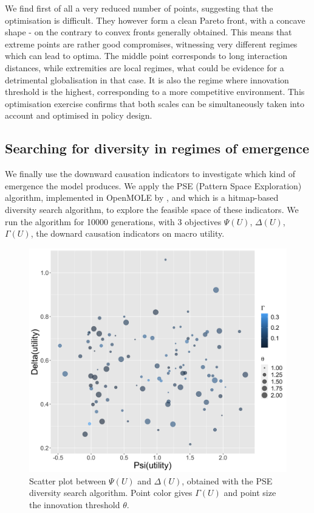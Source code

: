 \documentclass[letterpaper]{article}
\begin{document}
We find first of all a very reduced number of points, suggesting that the optimisation is difficult. They however form a clean Pareto front, with a concave shape - on the contrary to convex fronts generally obtained. This means that extreme points are rather good compromises, witnessing very different regimes which can lead to optima. The middle point corresponds to long interaction distances, while extremities are local regimes, what could be evidence for a detrimental globalisation in that case. It is also the regime where innovation threshold is the highest, corresponding to a more competitive environment. This optimisation exercise confirms that both scales can be simultaneously taken into account and optimised in policy design.


\subsection{Searching for diversity in regimes of emergence}


We finally use the downward causation indicators to investigate which kind of emergence the model produces. We apply the PSE (Pattern Space Exploration) algorithm, implemented in OpenMOLE by \cite{cherel2015beyond}, and which is a hitmap-based diversity search algorithm, to explore the feasible space of these indicators. We run the algorithm for 10000 generations, with 3 objectives $\Psi (U)$, $\Delta (U)$, $\Gamma (U)$, the downard causation indicators on macro utility.


\begin{figure}[h!]
    \centering
    \includegraphics[width=\linewidth]{figures/pse-psi-delta-utility_colorGamma_sizetheta.png}
    \caption{Scatter plot between $\Psi (U)$ and $\Delta (U)$, obtained with the PSE diversity search algorithm. Point color gives $\Gamma (U)$ and point size the innovation threshold $\theta$.\label{fig:pse}}
\end{figure}
\end{document}
